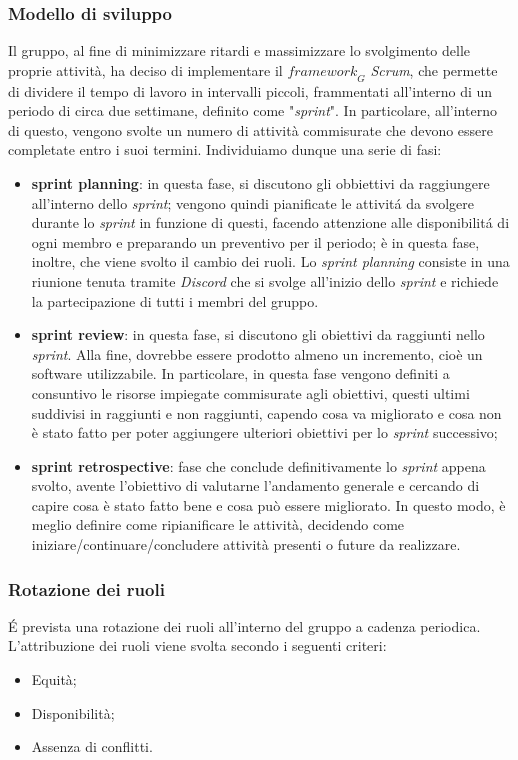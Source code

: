 \subsubsection{Modello di sviluppo}
Il gruppo, al fine di minimizzare ritardi e massimizzare lo svolgimento delle proprie attività, ha deciso
di implementare il $\textit{framework}_G$ \textit{Scrum}, che permette di dividere il tempo di lavoro in intervalli piccoli, frammentati all’interno di un periodo di circa due settimane, definito come "\textit{sprint}". In particolare, all’interno di
questo, vengono svolte un numero di attività commisurate che devono essere completate entro i suoi termini. Individuiamo dunque una serie di fasi:
\begin{itemize}
    \item \textbf{sprint planning}: in questa fase, si discutono gli obbiettivi da raggiungere all'interno dello \textit{sprint}; vengono quindi pianificate le attivitá da svolgere durante lo \textit{sprint} in funzione di questi, facendo attenzione alle disponibilitá di ogni membro e preparando un preventivo per il periodo; è in questa fase, inoltre, che viene svolto il cambio dei ruoli.
    Lo \textit{sprint planning} consiste in una riunione tenuta tramite \textit{Discord} che si svolge all'inizio dello \textit{sprint} e richiede la partecipazione di tutti i membri del gruppo.
    
    \item \textbf{sprint review}: in questa fase, si discutono gli obiettivi da raggiunti nello \textit{sprint}. Alla fine, dovrebbe essere prodotto almeno un incremento, cioè un software utilizzabile. In particolare, in questa fase vengono definiti a consuntivo le risorse impiegate commisurate agli obiettivi, questi ultimi suddivisi in raggiunti e non raggiunti, capendo cosa va migliorato e cosa non è stato fatto per poter aggiungere ulteriori obiettivi per lo \textit{sprint} successivo;
    
    \item \textbf{sprint retrospective}: fase che conclude definitivamente lo \textit{sprint} appena svolto, avente l'obiettivo di valutarne l'andamento generale e cercando di capire cosa è stato fatto bene e cosa può essere migliorato. In questo modo, è meglio definire come ripianificare le attività, decidendo come iniziare/continuare/concludere attività presenti o future da realizzare.
\end{itemize}

\subsubsection{Rotazione dei ruoli}
\'E prevista una rotazione dei ruoli all'interno del gruppo a cadenza periodica.
L’attribuzione dei ruoli viene svolta secondo i seguenti criteri:
\begin{itemize}
    \item Equità;
    \item Disponibilità;
    \item Assenza di conflitti.
\end{itemize}


